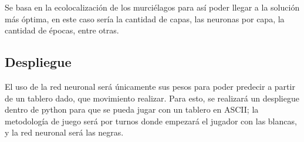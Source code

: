 Se basa en la ecolocalización de los murciélagos para así poder llegar a la solución más óptima, en este caso sería la cantidad de capas, las neuronas por capa, la cantidad de épocas, entre otras.

\subsection{Despliegue}

El uso de la red neuronal será únicamente sus pesos para poder predecir a partir de un tablero dado, que movimiento realizar. Para esto, se realizará un despliegue dentro de python para que se pueda jugar con un tablero en ASCII; la metodología de juego será por turnos donde empezará el jugador con las blancas, y la red neuronal será las negras.

